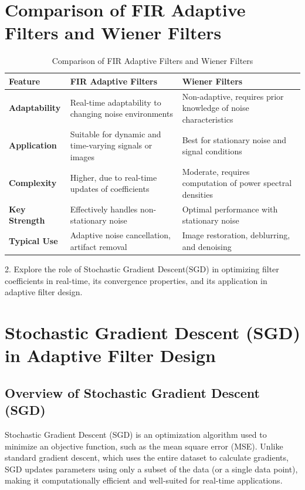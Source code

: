 \documentclass[hidelinks,12pt]{article}
\begin{document}
	\section*{Comparison of FIR Adaptive Filters and Wiener Filters}
	\begin{table}[h!]
		\centering
		\begin{tabular}{|p{3cm}|p{5cm}|p{5cm}|}
			\hline
			\textbf{Feature} & \textbf{FIR Adaptive Filters} & \textbf{Wiener Filters} \\ \hline
			\textbf{Adaptability} & Real-time adaptability to changing noise environments & Non-adaptive, requires prior knowledge of noise characteristics \\ \hline
			\textbf{Application} & Suitable for dynamic and time-varying signals or images & Best for stationary noise and signal conditions \\ \hline
			\textbf{Complexity} & Higher, due to real-time updates of coefficients & Moderate, requires computation of power spectral densities \\ \hline
			\textbf{Key Strength} & Effectively handles non-stationary noise & Optimal performance with stationary noise \\ \hline
			\textbf{Typical Use} & Adaptive noise cancellation, artifact removal & Image restoration, deblurring, and denoising \\ \hline
		\end{tabular}
		\caption{Comparison of FIR Adaptive Filters and Wiener Filters}
	\end{table}
	
	
	
	2. Explore the role of Stochastic Gradient Descent(SGD) in optimizing filter coefficients in real-time, its convergence properties, and its application in adaptive filter design.
	
	\section*{Stochastic Gradient Descent (SGD) in Adaptive Filter Design}
	
	\subsection*{Overview of Stochastic Gradient Descent (SGD)}
	Stochastic Gradient Descent (SGD) is an optimization algorithm used to minimize an objective function, such as the mean square error (MSE). Unlike standard gradient descent, which uses the entire dataset to calculate gradients, SGD updates parameters using only a subset of the data (or a single data point), making it computationally efficient and well-suited for real-time applications.
	
\end{document}
